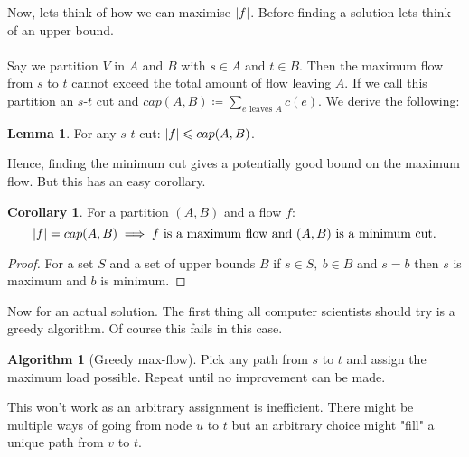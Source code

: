 \documentclass[11pt,a4paper, titlepage]{article}
\DeclarePairedDelimiter\abs{\lvert}{\rvert}
\theoremstyle{definition}
\newtheorem{corollary}[theorem]{Corollary}
\newtheorem{lemma}[theorem]{Lemma}
\newtheorem{algo}[theorem]{Algorithm}
\begin{document}
Now, lets think of how we can maximise $\abs{f}$. Before finding a solution lets think of an upper bound. 
\\
\\
Say we partition $V$ in $A$ and $B$ with $s \in A$ and $t \in B$. Then the maximum flow from $s$ to $t$ cannot exceed the total amount of flow leaving $A$. If we call this partition an $s$-$t$ cut and $cap(A,B) \coloneqq \displaystyle \sum_{e \text{ leaves } A} c(e)$. We derive the following:

\begin{lemma}
For any $s$-$t$ cut: $\abs{f} \leqslant cap(A,B)$. 
\end{lemma}

Hence, finding the minimum cut gives a potentially good bound on the maximum flow. But this has an easy corollary.

\begin{corollary}
For a partition $(A,B)$ and a flow $f$: 
\[
\abs{f} = cap(A,B) \implies f \text{ is a maximum flow and } (A,B) \text{ is a minimum cut.}	
\]
\end{corollary}
\begin{proof}
For a set $S$ and a set of upper bounds $B$ if $s\in S, \ b \in B$ and $s = b$ then $s$ is maximum and $b$ is minimum. 
\end{proof}

Now for an actual solution. The first thing all computer scientists should try is a greedy algorithm. Of course this fails in this case.

\begin{algo}[Greedy max-flow]
Pick any path from $s$ to $t$ and assign the maximum load possible. Repeat until no improvement can be made.
\end{algo}

This won't work as an arbitrary assignment is inefficient. There might be multiple ways of going from node $u$ to $t$ but an arbitrary choice might "fill" a unique path from $v$ to $t$.
\end{document}

